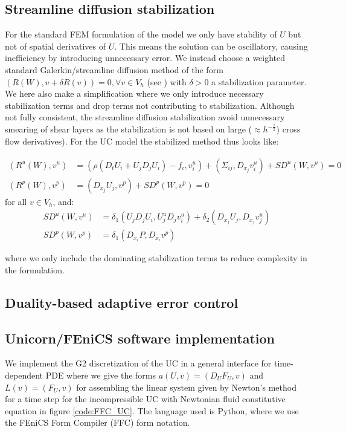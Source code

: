 \subsection{Streamline diffusion stabilization}

For the standard FEM formulation of the model we only have stability
of $U$ but not of spatial derivatives of $U$. This means the solution
can be oscillatory, causing inefficiency by introducing unnecessary
error. We instead choose a weighted standard Galerkin/streamline
diffusion method of the form $(R(W), v + \delta R(v)) = 0, \forall v
\in V_h$ (see \cite{ereshajo:cde}) with $\delta > 0$ a stabilization
parameter. We here also make a simplification where we only introduce
necessary stabilization terms and drop terms not contributing to
stabilization. Although not fully consistent, the streamline diffusion
stabilization avoid unnecessary smearing of shear layers as the
stabilization is not based on large ($\approx h^{-\frac{1}{2}}$) cross flow
derivatives). For the UC model the stabilized method thus looks like:

\begin{align*}
  (R^u(W), v^u) &= (\rho(D_t U_i + U_j D_j U_i) - f_i, v^u_i) + (\Sigma_{ij}, D_{x_j} v^u_i) + SD^u(W, v^u) = 0\\
  (R^p(W), v^p) &= (D_{x_j} U_j, v^p) + SD^p(W, v^p) = 0
\end{align*}
for all $v \in V_h$, and:
\begin{align*}
  SD^u(W, v^u) &= \delta_1 (U_j D_j U_i, U^u_j D_j v^u_i) +
  \delta_2 (D_{x_j} U_j, D_{x_j} v^u_j)\\
  SD^p(W, v^p) &= \delta_1 (D_{x_i} P, D_{x_i} v^p)
\end{align*}

where we only include the dominating stabilization terms to reduce
complexity in the formulation.

\subsection{Duality-based adaptive error control}

\subsection{Unicorn/FEniCS software implementation}

We implement the G2 discretization of the UC in a general interface
for time-dependent PDE where we give the forms $a(U, v) = (D_U F_U,
v)$ and $L(v) = (F_U, v)$ for assembling the linear system given by
Newton's method for a time step for the incompressible UC with
Newtonian fluid constitutive equation in figure \ref{code:FFC_UC}. The
language used is Python, where we use the FEniCS Form Compiler (FFC)
\cite{kirlog:2006} form notation.

